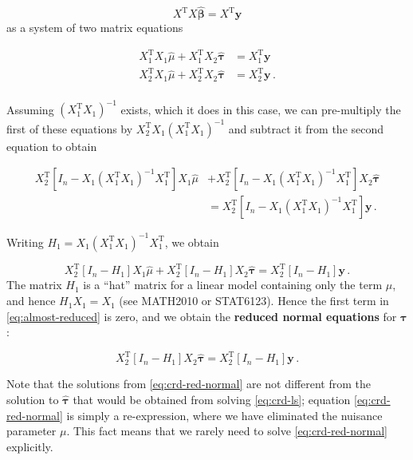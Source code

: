 \documentclass[
]{book}
\theoremstyle{definition}
\theoremstyle{definition}
\theoremstyle{definition}
\theoremstyle{definition}
\theoremstyle{remark}
\begin{document}
\begin{equation}
X^{\mathrm{T}}X\hat{\boldsymbol{\beta}} = X^{\mathrm{T}}\boldsymbol{y}
\label{eq:crd-ls}
\end{equation}
as a system of two matrix equations

\begin{align*}
X_1^{\mathrm{T}}X_1\hat{\mu} + X_1^{\mathrm{T}}X_2\hat{\boldsymbol{\tau}} & = X_1^{\mathrm{T}}\boldsymbol{y}\\
X_2^{\mathrm{T}}X_1\hat{\mu} + X_2^{\mathrm{T}}X_2\hat{\boldsymbol{\tau}} & = X_2^{\mathrm{T}}\boldsymbol{y}\,. \\
\end{align*}

Assuming \((X_1^{\mathrm{T}}X_1)^{-1}\) exists, which it does in this case, we can pre-multiply the first of these equations by \(X_2^{\mathrm{T}}X_1(X_1^{\mathrm{T}}X_1)^{-1}\) and subtract it from the second equation to obtain

\begin{align*}
X_2^{\mathrm{T}}[I_n - X_1(X_1^{\mathrm{T}}X_1)^{-1}X_1^{\mathrm{T}}]X_1\hat{\mu} 
& + X_2^{\mathrm{T}}[I_n - X_1(X_1^{\mathrm{T}}X_1)^{-1}X_1^{\mathrm{T}}]X_2\hat{\boldsymbol{\tau}} \\
& = X_2^{\mathrm{T}}[I_n - X_1(X_1^{\mathrm{T}}X_1)^{-1}X_1^{\mathrm{T}}]\boldsymbol{y}\,.
\end{align*}

Writing \(H_1 = X_1(X_1^{\mathrm{T}}X_1)^{-1}X_1^{\mathrm{T}}\), we obtain

\begin{equation}
X_2^{\mathrm{T}}[I_n - H_1]X_1\hat{\mu} + X_2^{\mathrm{T}}[I_n - H_1]X_2\hat{\boldsymbol{\tau}} = X_2^{\mathrm{T}}[I_n - H_1]\boldsymbol{y}\,.
\label{eq:almost-reduced}
\end{equation}
The matrix \(H_1\) is a ``hat'' matrix for a linear model containing only the term \(\mu\), and hence \(H_1X_1 = X_1\) (see MATH2010 or STAT6123). Hence the first term in \eqref{eq:almost-reduced} is zero, and we obtain the \textbf{reduced normal equations} for \(\boldsymbol{\tau}\):

\begin{equation}
X_2^{\mathrm{T}}[I_n - H_1]X_2\hat{\boldsymbol{\tau}} = X_2^{\mathrm{T}}[I_n - H_1]\boldsymbol{y}\,.
\label{eq:crd-red-normal}
\end{equation}

Note that the solutions from \eqref{eq:crd-red-normal} are not different from the solution to \(\hat{\boldsymbol{\tau}}\) that would be obtained from solving \eqref{eq:crd-ls}; equation \eqref{eq:crd-red-normal} is simply a re-expression, where we have eliminated the nuisance parameter \(\mu\). This fact means that we rarely need to solve \eqref{eq:crd-red-normal} explicitly.
\end{document}
